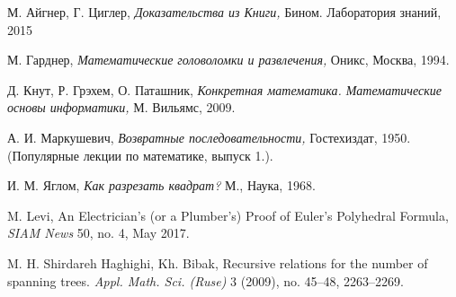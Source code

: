 \documentclass{article}
\begin{document}
\begin{thebibliography}{52}

 М. Айгнер, Г. Циглер, 
\emph{Доказательства из Книги,} 
Бином. Лаборатория знаний, 2015 

 М. Гарднер, \emph{Математические головоломки и развлечения,}  Оникс, Москва, 1994.

Д. Кнут, Р. Грэхем, О. Паташник,
\emph{Конкретная математика. Математические основы информатики,}
М. Вильямс, 
2009.

А. И. Маркушевич,
\emph{Возвратные последовательности,} 
Гостехиздат, 1950. (Популярные лекции по математике, выпуск 1.).


И. М. Яглом,
\emph{Как разрезать квадрат?}
М., Наука, 1968.

 M. Levi,
An Electrician’s (or a Plumber’s)
Proof of Euler’s Polyhedral Formula,
\emph{SIAM News} 50, no. 4, May 2017.


 M. H. Shirdareh Haghighi, Kh. Bibak, 
Recursive relations for the number of spanning trees. 
\emph{Appl. Math. Sci. (Ruse)} 3 (2009), no. 45--48, 2263--2269. 
\end{thebibliography}
\end{document}
